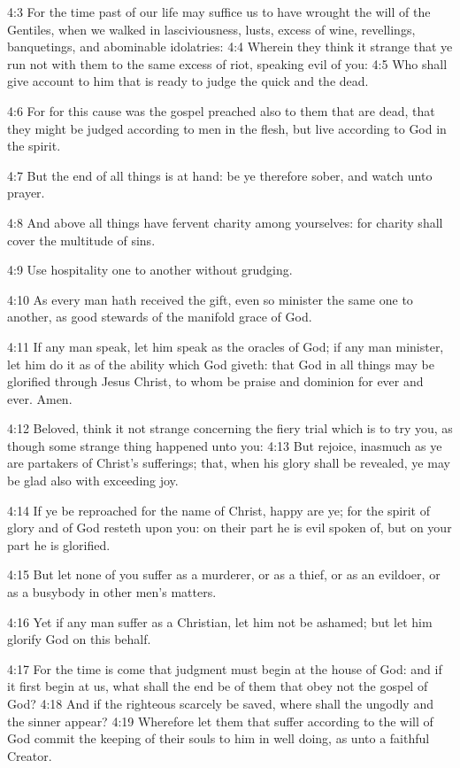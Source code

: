 4:3 For the time past of our life may suffice us to have wrought the will of the Gentiles, when we walked in lasciviousness, lusts, excess of wine, revellings, banquetings, and abominable idolatries: 4:4 Wherein they think it strange that ye run not with them to the same excess of riot, speaking evil of you: 4:5 Who shall give account to him that is ready to judge the quick and the dead.

4:6 For for this cause was the gospel preached also to them that are dead, that they might be judged according to men in the flesh, but live according to God in the spirit.

4:7 But the end of all things is at hand: be ye therefore sober, and watch unto prayer.

4:8 And above all things have fervent charity among yourselves: for charity shall cover the multitude of sins.

4:9 Use hospitality one to another without grudging.

4:10 As every man hath received the gift, even so minister the same one to another, as good stewards of the manifold grace of God.

4:11 If any man speak, let him speak as the oracles of God; if any man minister, let him do it as of the ability which God giveth: that God in all things may be glorified through Jesus Christ, to whom be praise and dominion for ever and ever. Amen.

4:12 Beloved, think it not strange concerning the fiery trial which is to try you, as though some strange thing happened unto you: 4:13 But rejoice, inasmuch as ye are partakers of Christ's sufferings; that, when his glory shall be revealed, ye may be glad also with exceeding joy.

4:14 If ye be reproached for the name of Christ, happy are ye; for the spirit of glory and of God resteth upon you: on their part he is evil spoken of, but on your part he is glorified.

4:15 But let none of you suffer as a murderer, or as a thief, or as an evildoer, or as a busybody in other men's matters.

4:16 Yet if any man suffer as a Christian, let him not be ashamed; but let him glorify God on this behalf.

4:17 For the time is come that judgment must begin at the house of God: and if it first begin at us, what shall the end be of them that obey not the gospel of God?  4:18 And if the righteous scarcely be saved, where shall the ungodly and the sinner appear?  4:19 Wherefore let them that suffer according to the will of God commit the keeping of their souls to him in well doing, as unto a faithful Creator.

